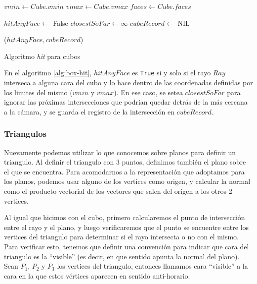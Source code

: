 \begin{algorithm}[H]
\begin{algorithmic}[1]
    \State $vmin \gets Cube.vmin$ 
    \State $vmax \gets Cube.vmax$
    \State $faces \gets Cube.faces$

    \State $hitAnyFace \gets$ False
    \State $closestSoFar \gets \infty$
    \State $cubeRecord \gets$ NIL

     

        \EndIf
    \EndFor

    \State \Return ($hitAnyFace, cubeRecord$)
\EndFunction
\end{algorithmic}
\caption{Algoritmo \textit{hit} para cubos}
\label{alg:box-hit}
\end{algorithm}

En el algoritmo \ref{alg:box-hit}, $hitAnyFace$ es \texttt{True} si y solo si el
rayo $Ray$ interseca a alguna cara del cubo y lo hace dentro de las coordenadas
definidas por los limites del mismo ($vmin$ y $vmax$). En ese caso, se setea
$closestSoFar$ para ignorar las próximas intersecciones que podrían quedar detrás
de la más cercana a la cámara, y se guarda el registro de la intersección en
$cubeRecord$.

\subsubsection{Triangulos}

Nuevamente podemos utilizar lo que conocemos sobre planos para definir un
triangulo. Al definir el triangulo con 3 puntos, definimos también el plano sobre
el que se encuentra. Para acomodarnos a la representación que adoptamos para los
planos, podemos usar alguno de los vertices como origen, y calcular la normal
como el producto vectorial de los vectores que salen del origen a los otros 2
vertices.


Al igual que hicimos con el cubo, primero calcularemos el punto de intersección
entre el rayo y el plano, y luego verificaremos que el punto se encuentre entre
los vertices del triangulo para determinar si el rayo intersecta o no con el
mismo. Para verificar esto, tenemos que definir una convención para indicar que
cara del triangulo es la ``visible'' (es decir, en que sentido apunta la normal
del plano). Sean $P_1$, $P_2$ y $P_3$ los vertices del triangulo, entonces llamamos
cara ``visible'' a la cara en la que estos vértices aparecen en sentido anti-horario.

